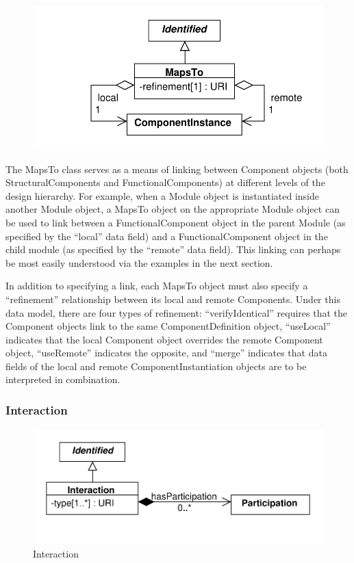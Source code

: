 \documentclass[draftspec]{sbmlpkgspec}
\begin{document}
\begin{figure}[ht]
\begin{center}
\includegraphics[scale=0.6]{uml/maps_to}
\caption[]{}
\label{uml:maps_to}
\end{center}
\end{figure}
The MapsTo class serves as a means of linking between Component objects (both StructuralComponents and FunctionalComponents) at different levels of the design hierarchy. For example, when a Module object is instantiated inside another Module object, a MapsTo object on the appropriate Module  object can be used to link between a FunctionalComponent object in the parent Module (as specified by the “local” data field) and a FunctionalComponent object in the child module (as specified by the “remote” data field). This linking can perhaps be most easily understood via the examples in the next section.

In addition to specifying a link, each MapsTo object must also specify a “refinement” relationship between its local and remote Components. Under this data model, there are four types of refinement: “verifyIdentical” requires that the Component objects link to the same ComponentDefinition object, “useLocal” indicates that the local Component object overrides the remote Component object, “useRemote” indicates the opposite, and “merge” indicates that data fields of the local and remote ComponentInstantiation objects are to be interpreted in combination.


\subsubsection{Interaction}
\label{sec:Interaction}

\begin{figure}[ht]
\begin{center}
\includegraphics[scale=0.6]{uml/interaction}
\caption[]{Interaction}
\label{uml:interaction}
\end{center}
\end{figure}
\end{document}
